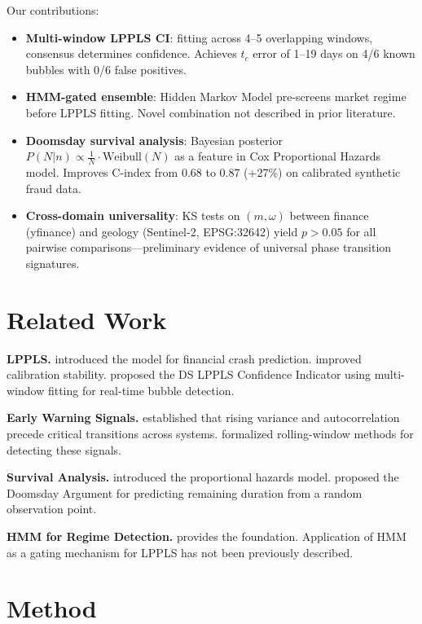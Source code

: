 \documentclass[11pt,a4paper]{article}
\begin{document}
Our contributions:
\begin{itemize}
    \item \textbf{Multi-window LPPLS CI}: fitting across 4--5 overlapping windows, consensus determines confidence. Achieves $t_c$ error of 1--19 days on 4/6 known bubbles with 0/6 false positives.
    \item \textbf{HMM-gated ensemble}: Hidden Markov Model pre-screens market regime before LPPLS fitting. Novel combination not described in prior literature.
    \item \textbf{Doomsday survival analysis}: Bayesian posterior $P(N|n) \propto \frac{1}{N} \cdot \text{Weibull}(N)$ as a feature in Cox Proportional Hazards model. Improves C-index from 0.68 to 0.87 (+27\%) on calibrated synthetic fraud data.
    \item \textbf{Cross-domain universality}: KS tests on $(m, \omega)$ between finance (yfinance) and geology (Sentinel-2, EPSG:32642) yield $p > 0.05$ for all pairwise comparisons---preliminary evidence of universal phase transition signatures.
\end{itemize}

\section{Related Work}

\textbf{LPPLS.} \citet{sornette2003} introduced the model for financial crash prediction. \citet{filimonov2013} improved calibration stability. \citet{sornette2015} proposed the DS LPPLS Confidence Indicator using multi-window fitting for real-time bubble detection.

\textbf{Early Warning Signals.} \citet{scheffer2009} established that rising variance and autocorrelation precede critical transitions across systems. \citet{dakos2012} formalized rolling-window methods for detecting these signals.

\textbf{Survival Analysis.} \citet{cox1972} introduced the proportional hazards model. \citet{gott1993} proposed the Doomsday Argument for predicting remaining duration from a random observation point.

\textbf{HMM for Regime Detection.} \citet{rabiner1989hmm} provides the foundation. Application of HMM as a gating mechanism for LPPLS has not been previously described.

\section{Method}
\end{document}

